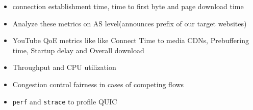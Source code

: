 \begin{frame}
    \begin{itemize}
    \itemsep3em 

    \item connection establishment time, time to first byte and page download time %

    \item Analyze these metrics on AS level(announces prefix of our target websites) %

    \item YouTube QoE metrics like like Connect Time to media CDNs, Prebuffering time, Startup delay and Overall download %

    \item Throughput and  CPU utilization %

    \item Congestion control fairness in cases of competing flows
    \item \texttt{perf} and \texttt{strace} to profile QUIC
\end{itemize}
 
\end{frame}
\clearpage

